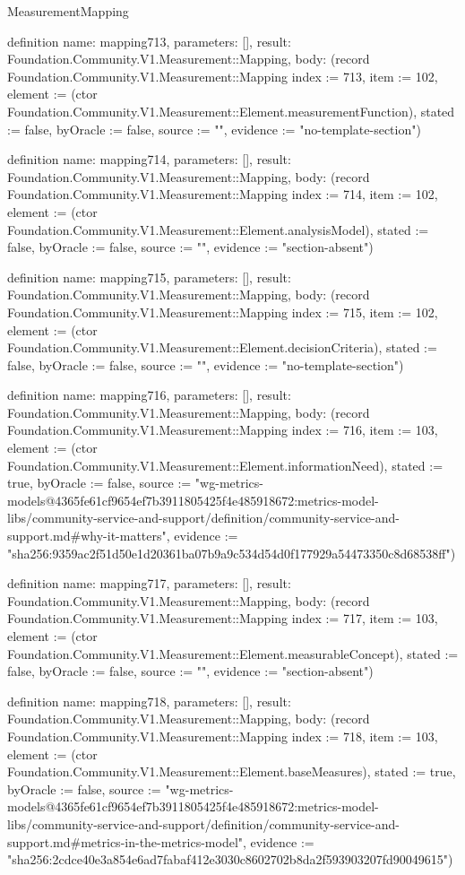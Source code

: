 \begin{lexlean}{MeasurementMapping}
\begin{semanticmodule}
definition{
  name: mapping713,
  parameters: [],
  result: Foundation.Community.V1.Measurement::Mapping,
  body: (record Foundation.Community.V1.Measurement::Mapping {index := 713, item := 102, element := (ctor Foundation.Community.V1.Measurement::Element.measurementFunction), stated := false, byOracle := false, source := "", evidence := "no-template-section"})
}

definition{
  name: mapping714,
  parameters: [],
  result: Foundation.Community.V1.Measurement::Mapping,
  body: (record Foundation.Community.V1.Measurement::Mapping {index := 714, item := 102, element := (ctor Foundation.Community.V1.Measurement::Element.analysisModel), stated := false, byOracle := false, source := "", evidence := "section-absent"})
}

definition{
  name: mapping715,
  parameters: [],
  result: Foundation.Community.V1.Measurement::Mapping,
  body: (record Foundation.Community.V1.Measurement::Mapping {index := 715, item := 102, element := (ctor Foundation.Community.V1.Measurement::Element.decisionCriteria), stated := false, byOracle := false, source := "", evidence := "no-template-section"})
}

definition{
  name: mapping716,
  parameters: [],
  result: Foundation.Community.V1.Measurement::Mapping,
  body: (record Foundation.Community.V1.Measurement::Mapping {index := 716, item := 103, element := (ctor Foundation.Community.V1.Measurement::Element.informationNeed), stated := true, byOracle := false, source := "wg-metrics-models@4365fe61cf9654ef7b3911805425f4e485918672:metrics-model-libs/community-service-and-support/definition/community-service-and-support.md#why-it-matters", evidence := "sha256:9359ac2f51d50e1d20361ba07b9a9c534d54d0f177929a54473350c8d68538ff"})
}

definition{
  name: mapping717,
  parameters: [],
  result: Foundation.Community.V1.Measurement::Mapping,
  body: (record Foundation.Community.V1.Measurement::Mapping {index := 717, item := 103, element := (ctor Foundation.Community.V1.Measurement::Element.measurableConcept), stated := false, byOracle := false, source := "", evidence := "section-absent"})
}

definition{
  name: mapping718,
  parameters: [],
  result: Foundation.Community.V1.Measurement::Mapping,
  body: (record Foundation.Community.V1.Measurement::Mapping {index := 718, item := 103, element := (ctor Foundation.Community.V1.Measurement::Element.baseMeasures), stated := true, byOracle := false, source := "wg-metrics-models@4365fe61cf9654ef7b3911805425f4e485918672:metrics-model-libs/community-service-and-support/definition/community-service-and-support.md#metrics-in-the-metrics-model", evidence := "sha256:2cdce40e3a854e6ad7fabaf412e3030c8602702b8da2f593903207fd90049615"})
}


\end{semanticmodule}
\end{lexlean}
